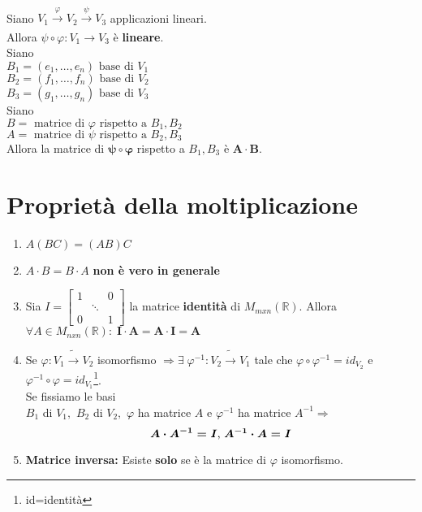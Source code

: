 \documentclass[a4paper, 12pt]{report}
\begin{document}
        \paragraph{} Siano $V_1 \xrightarrow[]{\varphi}V_2\xrightarrow[]{\psi}V_3$ applicazioni lineari.\\
        Allora $\psi \circ \varphi: V_1 \rightarrow V_3$ è \textbf{lineare}.\\
        Siano\\ 
        $
        B_1=(e_1,\dots,e_n) \text{ base di } V_1
        $\\$
        B_2=(f_1,\dots,f_n) \text{ base di } V_2
        $\\$        
        B_3=(g_1,\dots,g_n) \text{ base di } V_3
        $
        \\Siano\\
        $
        B= \text{ matrice di } \varphi \text{ rispetto a } B_1,B_2
        $\\$
        A= \text{ matrice di } \psi \text{ rispetto a } B_2,B_3
        $\\
        Allora la matrice di $\boldsymbol{\psi \circ \varphi}$ rispetto a $B_1,B_3$ è $\boldsymbol{A \cdot B}$. 
        \section{Proprietà della moltiplicazione}
        \begin{enumerate}
            \item $A(BC) = (AB)C$
            \item $A\cdot B =B \cdot A$ \textbf{non è vero in generale}
            \item Sia $I=
            \begin{bmatrix}
                1 & & 0\\
                &\ddots\\
                0 & & 1
            \end{bmatrix}
            $ la matrice \textbf{identità} di $M_{mxn}(\mathbb{R})$. Allora\\
            $\forall A \in M_{nxn}(\mathbb{R}): \; \boldsymbol{I \cdot A = A \cdot I = A}$
            \item Se $\varphi : V_1 \tilde{\rightarrow}V_2$ isomorfismo $\Rightarrow \exists \; \varphi^{-1}:V_2 \tilde{\rightarrow}V_1$
            tale che $\varphi \circ \varphi^{-1}= id_{V_2}$ e $\varphi^{-1} \circ \varphi= id_{V_1}$\footnote{id=identità}.\\
            Se fissiamo le basi \\$B_1$ di $V_1,$ $B_2 $ di $V_2,$ $\varphi$ ha matrice $A$ e $\varphi^{-1}$ ha matrice $A^{-1} \Rightarrow 
            $ $$\boldsymbol{A \cdot A^{-1} = I$, $A^{-1} \cdot A =I}$$ 
            \item \textbf{Matrice inversa:} Esiste \textbf{solo} se è la matrice di $\varphi$ isomorfismo.
        \end{enumerate}
        \clearpage
\end{document}
